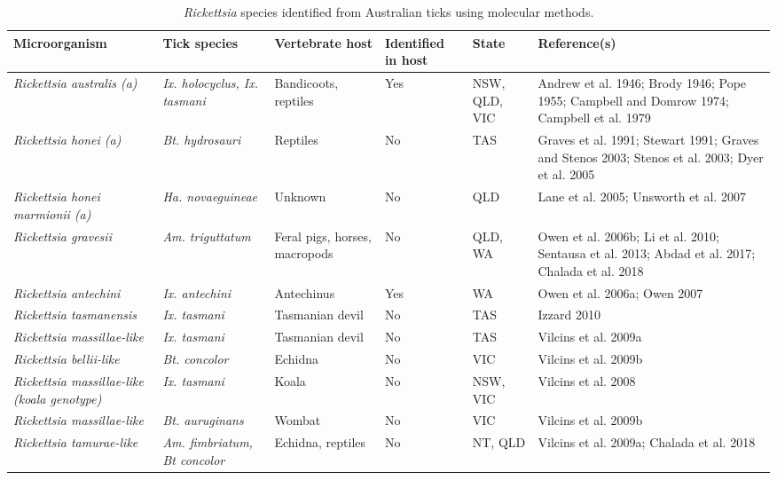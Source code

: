 \documentclass[a4paper, nobind]{templates/ociamthesis}
\begin{document}
\begin{table}

\caption[\textit{Rickettsia} species identified from Australian ticks.]{\label{tab:T1rickettsia}\textit{Rickettsia} species identified from Australian ticks using molecular methods.}
\centering
\fontsize{8}{10}\selectfont
\begin{tabular}[t]{>{\raggedright\arraybackslash}p{10em}>{\raggedright\arraybackslash}p{10em}>{\raggedright\arraybackslash}p{10em}>{\raggedright\arraybackslash}p{6em}>{\raggedright\arraybackslash}p{6em}>{\raggedright\arraybackslash}p{6em}}
\toprule
Microorganism & Tick species & Vertebrate host & Identified in host & State & Reference(s)\\
\midrule
\em{Rickettsia australis (a)} & \em{Ix. holocyclus, Ix. tasmani} & Bandicoots, reptiles & Yes & NSW, QLD, VIC & Andrew et al. 1946; Brody 1946; Pope 1955; Campbell and Domrow 1974; Campbell et al. 1979\\
\em{Rickettsia honei (a)} & \em{Bt. hydrosauri} & Reptiles & No & TAS & Graves et al. 1991; Stewart 1991; Graves and Stenos 2003;  Stenos et al. 2003; Dyer et al. 2005\\
\em{Rickettsia honei marmionii (a)} & \em{Ha. novaeguineae} & Unknown & No & QLD & Lane et al. 2005; Unsworth et al. 2007\\
\em{Rickettsia gravesii} & \em{Am. triguttatum} & Feral pigs, horses, macropods & No & QLD, WA & Owen et al. 2006b; Li et al. 2010; Sentausa et al. 2013; Abdad et al. 2017; Chalada et al. 2018\\
\em{Rickettsia antechini} & \em{Ix. antechini} & Antechinus & Yes & WA & Owen et al. 2006a; Owen 2007\\
\em{Rickettsia tasmanensis} & \em{Ix. tasmani} & Tasmanian devil & No & TAS & Izzard 2010\\
\em{Rickettsia massillae-like} & \em{Ix. tasmani} & Tasmanian devil & No & TAS & Vilcins et al. 2009a\\
\em{Rickettsia bellii-like} & \em{Bt. concolor} & Echidna & No & VIC & Vilcins et al. 2009b\\
\em{Rickettsia massillae-like (koala genotype)} & \em{Ix. tasmani} & Koala & No & NSW, VIC & Vilcins et al. 2008\\
\em{Rickettsia massillae-like} & \em{Bt. auruginans} & Wombat & No & VIC & Vilcins et al. 2009b\\
\em{Rickettsia tamurae-like} & \em{Am. fimbriatum, Bt concolor} & Echidna, reptiles & No & NT, QLD & Vilcins et al. 2009a; Chalada et al. 2018\\

\end{tabular}
\end{table}
\end{document}
